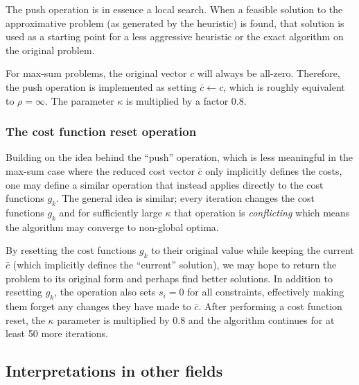 The push operation is in essence a local search.
When a feasible solution to the approximative problem (as generated by the heuristic) is found, that solution is used as a starting point for a less aggressive heuristic or the exact algorithm on the original problem.

For max-sum problems, the original vector \(c\) will always be all-zero.
Therefore, the push operation is implemented as setting \(\bar{c} \leftarrow c\), which is roughly equivalent to \(\rho=\infty\).
The parameter \(\kappa\) is multiplied by a factor \num{0.8}.

\subsubsection{The cost function reset operation}
Building on the idea behind the \enquote{push} operation, which is less meaningful in the max-sum case where the reduced cost vector \(\bar{c}\) only implicitly defines the costs, one may define a similar operation that instead applies directly to the cost functions \(g_k\).
The general idea is similar; every iteration changes the cost functions \(g_k\) and for sufficiently large \(\kappa\) that operation is \emph{conflicting} \parencite[\pno~15\psq]{Wedelin13} which means the algorithm may converge to non-global optima.

By resetting the cost functions \(g_k\) to their original value while keeping the current \(\bar{c}\) (which implicitly defines the \enquote{current} solution), we may hope to return the problem to its original form and perhaps find better solutions.
In addition to resetting \(g_k\), the operation also sets \(s_i=0\) for all constraints, effectively making them forget any changes they have made to \(\bar{c}\).
After performing a cost function reset, the \(\kappa\) parameter is multiplied by \num{0.8} and the algorithm continues for at least 50 more iterations.


\subsection{Interpretations in other fields}
